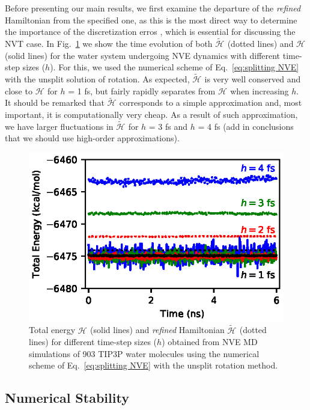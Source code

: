 \documentclass[
journal=jctcce,
layout=twocolumn
]{achemso}
\newcommand{\Ham}[1]{{\mathcal H}_\text{#1}}    %
\newcommand{\timestep}{h}
\newcommand{\refined}[1]{\widetilde{#1}}
\begin{document}
Before presenting our main results, we first examine the departure of the \textit{refined} Hamiltonian from the specified one, as this is the most direct way to determine the importance of the discretization erros \cite{Engle_2005}, which is essential for discussing the NVT case.
In Fig.~\ref{fig:nve} we show the time evolution of both $\refined{\Ham{}}$ (dotted lines) and $\Ham{}$ (solid lines) for the water system undergoing NVE dynamics with different time-step sizes ($\timestep$).
For this, we used the numerical scheme of Eq.~\ref{eq:splitting NVE} with the unsplit solution of rotation.
As expected, $\refined{\Ham{}}$ is very well conserved and close to $\Ham{}$ for $\timestep$ = 1 fs, but fairly rapidly separates from $\Ham{}$ when increasing $\timestep$. 
It should be remarked that $\refined{\Ham{}}$ corresponds to a simple approximation and, most important, it is computationally very cheap.
As a result of such approximation, we have larger fluctuations in $\refined{\Ham{}}$ for $\timestep$ = 3 fs and $\timestep$ = 4 fs (add in conclusions that we should use high-order approximations).

\begin{figure}
	\includegraphics{Figures/NVE.eps}
	\caption{Total energy $\Ham{}$ (solid lines) and \textit{refined} Hamiltonian $\refined{\Ham{}}$ (dotted lines) for different time-step sizes ($\timestep$) obtained from NVE MD simulations of 903 TIP3P\cite{Jorgensen_1983} water molecules using the numerical scheme of Eq.~\ref{eq:splitting NVE} with the unsplit rotation method.}
	\label{fig:nve}
\end{figure}

 \subsection*{Numerical Stability}
\end{document}
